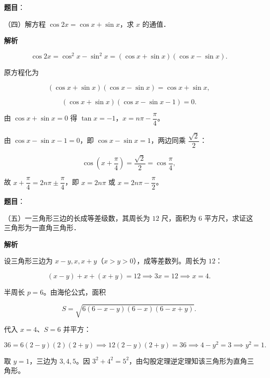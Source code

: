 \begin{answer}

\textbf{题目}：

（四）解方程 $\cos2x=\cos x+\sin x$，求 $x$ 的通值．

\textbf{解析}

\nopagebreak[4]
\[
\cos2x=\cos^2x-\sin^2x=(\cos x+\sin x)(\cos x-\sin x).
\]

原方程化为

\nopagebreak[4]
\[
(\cos x+\sin x)(\cos x-\sin x)=\cos x+\sin x,
\]

\nopagebreak[4]
\[
(\cos x+\sin x)(\cos x-\sin x-1)=0.
\]

由 $\cos x+\sin x=0$ 得 $\tan x=-1$，$x=n\pi-\dfrac\pi4$。

由 $\cos x-\sin x-1=0$，即 $\cos x-\sin x=1$，两边同乘 $\dfrac{\sqrt2}{2}$：

\nopagebreak[4]
\[
\cos\left(x+\frac\pi4\right)=\frac{\sqrt2}{2}=\cos\frac\pi4,
\]

故 $x+\dfrac\pi4=2n\pi\pm\dfrac\pi4$，即 $x=2n\pi$ 或 $x=2n\pi-\dfrac\pi2$。


\end{answer}
\begin{answer}

\textbf{题目}：

（五）一三角形三边的长成等差级数，其周长为 $12$ 尺，面积为 $6$ 平方尺，求证这三角形为一直角三角形．

\textbf{解析}

设三角形三边为 $x-y,x,x+y$（$x>y>0$），成等差数列。周长为 $12$：

\nopagebreak[4]
\[
(x-y)+x+(x+y)=12\implies 3x=12\implies x=4.
\]

半周长 $p=6$。由海伦公式，面积

\nopagebreak[4]
\[
S=\sqrt{6(6-x-y)(6-x)(6-x+y)}.
\]

代入 $x=4$、$S=6$ 并平方：

\nopagebreak[4]
\[
36=6(2-y)(2)(2+y)
\implies 12(2-y)(2+y)=36
\implies 4-y^2=3
\implies y^2=1.
\]

取 $y=1$，三边为 $3,4,5$。因 $3^2+4^2=5^2$，由勾股定理逆定理知该三角形为直角三角形。


\end{answer}